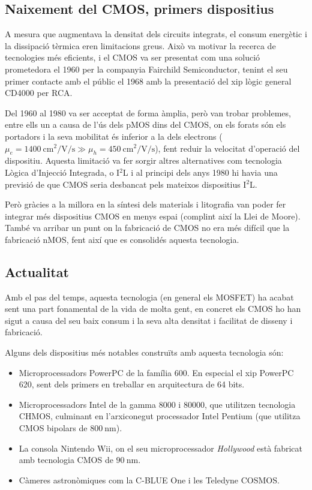 \documentclass[11pt,a4paper]{article}
\begin{document}
\subsection{Naixement del CMOS, primers dispositius}

A mesura que augmentava la densitat dels circuits integrats, el consum energètic i la dissipació tèrmica eren limitacions greus. Això va motivar la recerca de tecnologies més eficients, i el CMOS va ser presentat com una solució prometedora el 1960 per la companyia Fairchild Semiconductor, tenint el seu primer contacte amb el públic el 1968 amb la presentació del xip lògic general CD4000 per RCA\autocite{wiki:4000-series_integrated_circuits}.

Del 1960 al 1980 va ser acceptat de forma àmplia, però van trobar problemes, entre ells un a causa de l'ús dels pMOS dins del CMOS, on els forats són els portadors i la seva mobilitat és inferior a la dels electrons ($\mu_e = \qty{1400}{\centi\meter\squared\per\volt\per\second} \gg \mu_h = \qty{450}{\centi\meter\squared\per\volt\per\second}$), fent reduir la velocitat d'operació del dispositiu. Aquesta limitació va fer sorgir altres alternatives com tecnologia Lògica d'Injecció Integrada, o I$^2$L i al principi dels anys 1980 hi havia una previsió de que CMOS seria desbancat pels mateixos dispositius I$^2$L. 

Però gràcies a la millora en la síntesi dels materials i litografia van poder fer integrar més dispositius CMOS en menys espai (complint així la Llei de Moore). També va arribar un punt on la fabricació de CMOS no era més difícil que la fabricació nMOS, fent així que es consolidés aquesta tecnologia.

\subsection{Actualitat}

Amb el pas del temps, aquesta tecnologia (en general els MOSFET) ha acabat sent una part fonamental de la vida de molta gent, en concret els CMOS ho han sigut a causa del seu baix consum i la seva alta densitat i facilitat de disseny i fabricació. 

Alguns dels dispositius més notables construïts amb aquesta tecnologia són:
\begin{itemize}
    \item Microprocessadors PowerPC de la família 600. En especial el xip PowerPC 620, sent dels primers en treballar en arquitectura de 64 bits.
    \item Microprocessadors Intel de la gamma 8000 i 80000, que utilitzen tecnologia CHMOS, culminant en l'arxiconegut processador Intel Pentium (que utilitza CMOS bipolars de $\qty{800}{\nano\meter}$).
    \item La consola Nintendo Wii, on el seu microprocessador \textit{Hollywood} està fabricat amb tecnologia CMOS de $\qty{90}{\nano\meter}$.
    \item Càmeres astronòmiques com la C-BLUE One i les Teledyne COSMOS.
\end{itemize}
\end{document}
